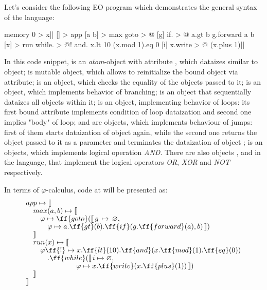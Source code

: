 Let's consider the following EO program which demonstrates the general syntax of the language:
\begin{ffcode}
memory 0 > x|$\label{ln:def0}$|
[] > app
  [a b] > max
    goto > @
      [g]
        if. > @
          a.gt b
          g.forward a
          b
  [x] > run
    while. > @!
      and.
        x.lt 10
        (x.mod 1).eq 0
      [i]
        x.write > @
          (x.plus 1)|$\label{ln:def1}$|
\end{ffcode}
In this code snippet,  is an \emph{atom}-object with attribute , which dataizes similar to  object;
 is mutable object, which allows to reinitialize the bound object  via  attribute;
 is an object, which checks the equality of the objects passed to it;
 is an object, which implements behavior of branching;
 is an object that sequentially dataizes all objects within it;
 is an object, implementing behavior of loops: its first bound attribute implements condition of loop dataization and second one implies "body" of loop;
 and  are objects, which implements behaviour of jumps: first of them starts dataization of object  again, while the second one returns the object passed to it as a parameter and terminates the dataization of object ;
 is an objects, which implements logical operation \emph{AND}.
There are also objects ,  and  in the language, that implement the logical operators \emph{OR}, \emph{XOR} and \emph{NOT} respectively.

In terms of $\varphi$-calculus, code at  will be presented as:
\begin{equation}
\begin{split}
& app \mapsto \llbracket \br
& \quad max(a, b) \mapsto \llbracket \br
& \quad \quad \varphi \mapsto \ff{goto}(\llbracket\,g\,\mapsto\,\varnothing,\br
& \quad \quad \quad \varphi \mapsto a.\ff{gt}(b).\ff{if}(g.\ff{forward}(a), b) \,\rrbracket) \br
& \quad \rrbracket \br
& \quad run(x) \mapsto \llbracket \br
& \quad \quad \varphi\ff{!} \mapsto x.\ff{lt}(10).\ff{and}(x.\ff{mod}(1).\ff{eq}(0)) \br
& \quad \quad \quad .\ff{while}(\llbracket\,i \mapsto \varnothing, \br
& \quad \quad \quad \quad \quad \quad \quad \varphi \mapsto x.\ff{write}(x.\ff{plus}(1))\,\rrbracket) \br
& \quad \rrbracket \br
& \rrbracket \\
\end{split}
\end{equation}


